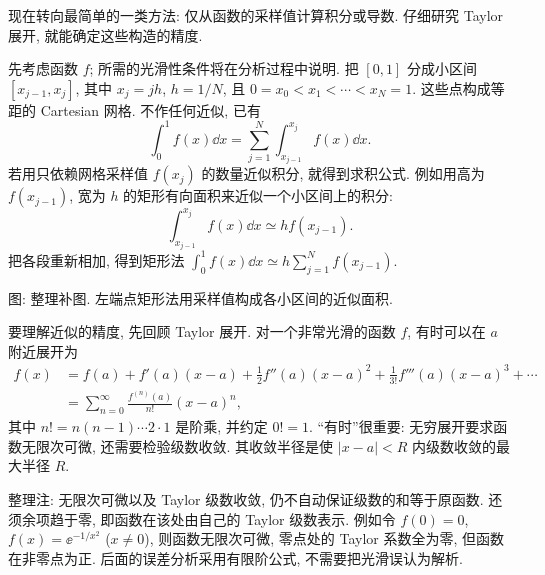 \label{ch:quadrature-difference}

现在转向最简单的一类方法: 仅从函数的采样值计算积分或导数. 仔细研究 Taylor 展开, 就能确定这些构造的精度.


先考虑函数 $f$; 所需的光滑性条件将在分析过程中说明. 把 $[0,1]$ 分成小区间 $[x_{j-1},x_j]$, 其中 $x_j=jh$, $h=1/N$, 且 $0=x_0<x_1<\cdots<x_N=1$. 这些点构成等距的 Cartesian 网格. 不作任何近似, 已有
\[
\int_0^1 f(x)\dd x=\sum_{j=1}^{N}\int_{x_{j-1}}^{x_j}f(x)\dd x.
\]
若用只依赖网格采样值 $f(x_j)$ 的数量近似积分, 就得到求积公式. 例如用高为 $f(x_{j-1})$, 宽为 $h$ 的矩形有向面积来近似一个小区间上的积分:
\[
\int_{x_{j-1}}^{x_j}f(x)\dd x\simeq hf(x_{j-1}).
\]
把各段重新相加, 得到矩形法 $\int_0^1f(x)\dd x\simeq h\sum_{j=1}^{N}f(x_{j-1})$.

\begin{center}
\par 图: 整理补图. 左端点矩形法用采样值构成各小区间的近似面积.
\end{center}

要理解近似的精度, 先回顾 Taylor 展开. 对一个非常光滑的函数 $f$, 有时可以在 $a$ 附近展开为
\begin{align*}
f(x)&=f(a)+f'(a)(x-a)+\frac12f''(a)(x-a)^2+\frac1{3!}f'''(a)(x-a)^3+\cdots\\
&=\sum_{n=0}^{\infty}\frac{f^{(n)}(a)}{n!}(x-a)^n,
\end{align*}
其中 $n!=n(n-1)\cdots2\cdot1$ 是阶乘, 并约定 $0!=1$. “有时”很重要: 无穷展开要求函数无限次可微, 还需要检验级数收敛. 其收敛半径是使 $|x-a|<R$ 内级数收敛的最大半径 $R$.

\begin{remark}
整理注: 无限次可微以及 Taylor 级数收敛, 仍不自动保证级数的和等于原函数. 还须余项趋于零, 即函数在该处由自己的 Taylor 级数表示. 例如令 $f(0)=0$, $f(x)=\ee^{-1/x^2}$ ($x\neq0$), 则函数无限次可微, 零点处的 Taylor 系数全为零, 但函数在非零点为正. 后面的误差分析采用有限阶公式, 不需要把光滑误认为解析.
\end{remark}

